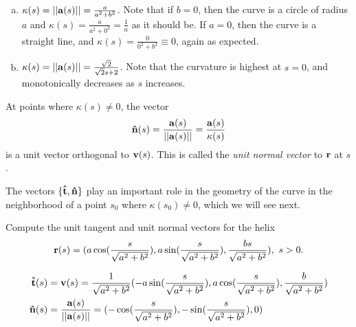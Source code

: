 \documentclass[12pt,letterpaper,reqno]{article}
\numberwithin{equation}{section}
\newcommand{\bv}{{\bf v}}
\newcommand{\ba}{{\bf a}}
\newcommand{\bbr}{{\bf r}}
\newcommand{\ut}{{\bf {\hat{t}}}}
\newcommand{\un}{{\bf {\hat{n}}}}
\begin{document}
{{\color{red}
\begin{solution}\hspace{15cm}
	\begin{enumerate}[(a)]
		\item $\kappa(s)=||\ba(s)||=\frac{a}{a^2+b^2}$. Note that if $b=0$, then the curve is a circle of radius $a$ and $\kappa(s)=\frac{a}{a^2+0^2}=\frac{1}{a}$ as it should be. If $a=0$, then the curve is a straight line, and $\kappa(s)=\frac{0}{0^2+b^2}\equiv 0$, again as expected.
		\item $\kappa(s)=||\ba(s)||=\frac{\sqrt{2}}{\sqrt{2}s+2}$. Note that the curvature is highest at $s=0$, and monotonically decreases as $s$ increases.
	\end{enumerate}
\end{solution}}
	

\begin{defn}
At points where $\kappa(s) \neq 0$, the vector
\begin{align*}
	\mathbf{\hat{n}}(s)=\frac{\ba(s)}{||\ba(s)||}=\frac{\ba(s)}{\kappa(s)}
\end{align*}
is a unit vector orthogonal to $\bv(s)$. This is called the \emph{unit normal vector} to $\bbr$ at $s$.	
\end{defn}
The vectors $\{\ut, \un\}$ play an important role in the geometry of the curve in the neighborhood of a point $s_0$ where $\kappa(s_0)\neq 0$, which we will see next.

\begin{exercise}
Compute the unit tangent and unit normal vectors for the helix
\begin{align*}
	\bbr(s)=(a \cos(\frac{s}{\sqrt{a^2+b^2}}),a \sin(\frac{s}{\sqrt{a^2+b^2}}),\frac{bs}{\sqrt{a^2+b^2}}), \ s>0.
\end{align*}
\end{exercise}

{\color{red}
\begin{solution}
	\begin{align*}
		\ut(s)&=\bv(s)=\frac{1}{\sqrt{a^2+b^2}}(-a\sin(\frac{s}{\sqrt{a^2+b^2}}),a\cos(\frac{s}{\sqrt{a^2+b^2}}),\frac{b}{\sqrt{a^2+b^2}}) \\
		\un(s)&=\frac{\ba(s)}{||\ba(s)||}=(-\cos(\frac{s}{\sqrt{a^2+b^2}}),-\sin(\frac{s}{\sqrt{a^2+b^2}}),0)
	\end{align*}
\end{solution}}


}
\end{document}

